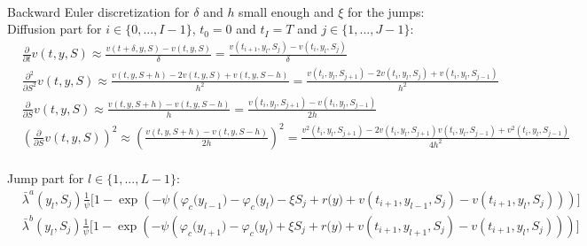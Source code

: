\documentclass[8pt]{article}
\begin{document}
\\

Backward Euler discretization for $\delta$ and $h$ small enough and $\xi$ for the jumps:\\

Diffusion part for $i \in \{0,...,I-1\}$, $t_0=0$ and $t_I=T$ and $j \in \{1,...,J-1\}$:\\

$\begin{aligned}
&\frac{\partial}{\partial t} v(t, y, S) \approx \frac{v(t + \delta,y,S) - v(t,y,S)}{\delta} = \frac{v(t_{i+1},y_l,S_j) - v(t_{i},y_l,S_j)}{\delta} \\
&\frac{\partial^2}{\partial S^2} v(t, y, S) \approx \frac{v(t,y,S+h) - 2v(t,y,S) + v(t,y,S-h)}{h^2} = \frac{v(t_{i},y_l,S_{j+1}) - 2v(t_{i},y_l,S_j) + v(t_{i},y_l,S_{j-1})}{h^2} \\
&\frac{\partial}{\partial S} v(t,y,S) \approx \frac{v(t,y,S+h) - v(t,y,S-h)}{h} = \frac{v(t_i,y_l,S_{j+1}) - v(t_i,y_l,S_{j-1})}{2h} \, \\
&\left(\frac{\partial}{\partial S} v(t,y,S)\right)^2 \approx \left(\frac{v(t,y,S+h) - v(t,y,S-h)}{2h}\right)^2 = \frac{v^2(t_i,y_l,S_{j+1}) - 2v(t_i,y_l,S_{j+1})v(t_i,y_l,S_{j-1}) + v^2(t_i,y_l,S_{j-1})}{4h^2}
\end{aligned}$\\ \\

Jump part for $l \in \{1,...,L-1\}$:\\

$\begin{aligned}
&\bar{\lambda}^a(y_l, S_j) \frac{1}{\psi} \big[ 1 - \exp \left(-\psi \left(\varphi_c \big(y_{l-1} \big) - \varphi_c \big(y_l \big) - \xi S_j + r \big(y \big) + v(t_{i+1}, y_{l-1}, S_j) - v(t_{i+1}, y_l, S_j) \right)\right) \big] \\
&\bar{\lambda}^b(y_l, S_j) \frac{1}{\psi} \big[ 1 - \exp \left(-\psi \left(\varphi_c \big(y_{l+1} \big) - \varphi_c \big(y_l \big) + \xi S_j + r \big(y \big) + v(t_{i+1}, y_{l+1}, S_j) - v(t_{i+1}, y_l, S_j) \right)\right) \big]
\end{aligned}$ \\
\end{document}

